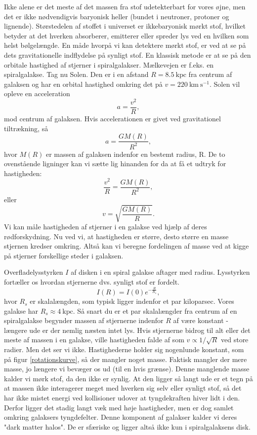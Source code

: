 Ikke alene er det meste af det massen fra stof udetekterbart for vores øjne, men det er ikke nødvendigvis baryonisk heller (bundet i neutroner, protoner og lignende). Størstedelen af stoffet i universet er ikkebaryonisk mørkt stof, hvilket betyder at det hverken absorberer, emitterer eller spreder lys ved en hvilken som helst bølgelængde. En måde hvorpå vi kan detektere mørkt stof, er ved at se på dets gravitationelle indflydelse på synligt stof. En klassisk metode er at se på den orbitale hastighed af stjerner i spiralgalakser. Mælkevejen er f.eks. en spiralgalakse. Tag nu Solen. Den er i en afstand $R=8.5~\text{kpc}$ fra centrum af galaksen og har en orbital hastighed omkring det på $v=220~\text{km}~\text{s}^{-1}$. Solen vil opleve en acceleration
\begin{equation}
a = \frac{v^2}{R} ,
\end{equation}
mod centrum af galaksen. Hvis accelerationen er givet ved gravitationel tiltrækning, så
\begin{equation}
a = \frac{G M(R)}{R^2},
\end{equation}
hvor $M(R)$ er massen af galaksen indenfor en bestemt radius, R. De to ovenstående ligninger kan vi sætte lig hinanden for da at få et udtryk for hastigheden:
\begin{equation}
\frac{v^2}{R} = \frac{G M(R)}{R^2},
\end{equation}
eller
\begin{equation}
v = \sqrt{\frac{G M(R)}{R}}.
\end{equation}
Vi kan måle hastigheden af stjerner i en galakse ved hjælp af deres rødforskydning. Nu ved vi, at hastigheden er større, desto større en masse stjernen kredser omkring. Altså kan vi beregne fordelingen af masse ved at kigge på stjerner forskellige steder i galaksen.

Overfladelysstyrken $I$ af disken i en spiral galakse aftager med radius. Lysstyrken fortæller os hvordan stjernerne dvs. synligt stof er fordelt.
\begin{equation}
I(R) = I(0) e^{-\frac{R}{R_s}},
\end{equation}
hvor $R_s$ er skalalængden, som typisk ligger indenfor et par kiloparsec. Vores galakse har $R_s\approx 4~\text{kpc}$. Så snart du er et par skalalængder fra centrum af en spiralgalakse begynder massen af stjernerne indenfor $R$ af være konstant - længere ude er der nemlig næsten intet lys. Hvis stjernerne bidrog til alt eller det meste af massen i en galakse, ville hastigheden falde af som $v \propto 1/\sqrt{R}$ ved store radier. Men det ser vi ikke. Hastighederne holder sig nogenlunde konstant, som på figur \ref{rotationskurve}, så der mangler noget masse. Faktisk mangler der mere masse, jo længere vi bevæger os ud (til en hvis grænse). Denne manglende masse kalder vi mørk stof, da den ikke er synlig. At den ligger så langt ude er et tegn på at massen ikke interagerer meget med hverken sig selv eller synligt stof, så det har ikke mistet energi ved kollisioner udover at tyngdekraften hiver lidt i den. Derfor ligger det stadig langt væk med høje hastigheder, men er dog samlet omkring galaksers tyngdefelter. Denne komponent af galakser kalder vi deres "dark matter halos". De er sfæriske og ligger altså ikke kun i spiralgalaksens disk.


